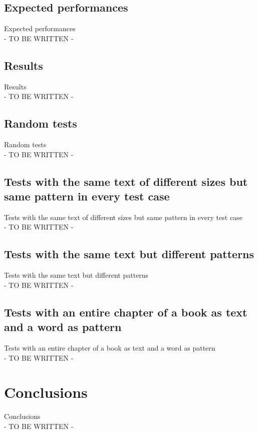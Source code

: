 \documentclass[11pt]{article}
\begin{document}
        \subsection{Expected performances} \label{subsec:expected_performances}

            Expected performances \\
            - TO BE WRITTEN -

        \subsection{Results} \label{subsec:results}

            Results \\
            - TO BE WRITTEN -

            \subsection{Random tests} \label{subsec:tests_1}

                Random tests \\
                - TO BE WRITTEN -

            \subsection{Tests with the same text of different sizes but same pattern in every test case} \label{subsec:tests_2}

                Tests with the same text of different sizes but same pattern in every test case \\
                - TO BE WRITTEN -

            \subsection{Tests with the same text but different patterns} \label{subsec:tests_3}

                Tests with the same text but different patterns \\
                - TO BE WRITTEN -

            \subsection{Tests with an entire chapter of a book as text and a word as pattern} \label{subsec:tests_4}

                Tests with an entire chapter of a book as text and a word as pattern \\
                - TO BE WRITTEN -

    \section{Conclusions} \label{sec:conclusions}

        Conclusions \\
        - TO BE WRITTEN -
\end{document}
